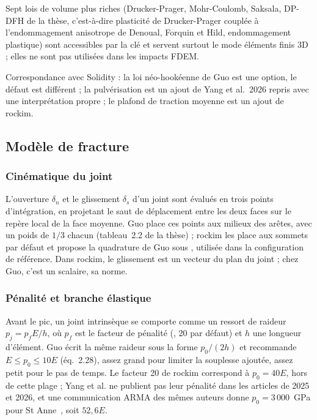 Sept lois de volume plus riches (Drucker-Prager, Mohr-Coulomb, Saksala, DP-DFH de la thèse, c'est-à-dire plasticité de Drucker-Prager couplée à l'endommagement anisotrope de Denoual, Forquin et Hild, endommagement plastique) sont accessibles par la clé  et servent surtout le mode éléments finis 3D ; elles ne sont pas utilisées dans les impacts FDEM.

Correspondance avec Solidity : la loi néo-hookéenne de Guo est une option, le défaut est différent ; la pulvérisation est un ajout de Yang et al.~2026 repris avec une interprétation propre ; le plafond de traction moyenne est un ajout de rockim.

\subsection{Modèle de fracture}
\label{sec-fracture}

\subsubsection{Cinématique du joint}

L'ouverture $\delta_n$ et le glissement $\delta_s$ d'un joint sont évalués en trois points d'intégration, en projetant le saut de déplacement entre les deux faces sur le repère local de la face moyenne. Guo place ces points aux milieux des arêtes, avec un poids de $1/3$ chacun (tableau~{2.2} de la thèse) ; rockim les place aux sommets par défaut et propose la quadrature de Guo sous , utilisée dans la configuration de référence. Dans rockim, le glissement est un vecteur du plan du joint ; chez Guo, c'est un scalaire, sa norme.

\subsubsection{Pénalité et branche élastique}
\label{sec-penalite}

Avant le pic, un joint intrinsèque se comporte comme un ressort de raideur $p_j = p_f E/h$, où $p_f$ est le facteur de pénalité (, 20 par défaut) et $h$ une longueur d'élément. Guo écrit la même raideur sous la forme $p_0/(2h)$ et recommande $E \leq p_0 \leq 10E$ (éq.~{2.28}), assez grand pour limiter la souplesse ajoutée, assez petit pour le pas de temps. Le facteur 20 de rockim correspond à $p_0 = 40E$, hors de cette plage ; Yang et al. ne publient pas leur pénalité dans les articles de 2025 et 2026, et une communication ARMA des mêmes auteurs donne $p_0 = 3\,000$~GPa pour St Anne~\cite{yang2024energy}, soit $52{,}6E$.


